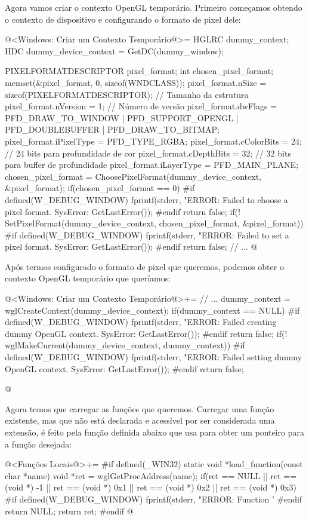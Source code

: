 Agora vamos criar o contexto OpenGL temporário. Primeiro começamos
obtendo o contexto de dispositivo e configurando o formato de pixel
dele:

\iniciocodigo
@<Windows: Criar um Contexto Temporário@>=
HGLRC dummy_context;
HDC dummy_device_context = GetDC(dummy_window);
{
  PIXELFORMATDESCRIPTOR pixel_format;
  int chosen_pixel_format;
  memset(&pixel_format, 0, sizeof(WNDCLASS));
  pixel_format.nSize = sizeof(PIXELFORMATDESCRIPTOR); // Tamanho da estrutura
  pixel_format.nVersion = 1; // Número de versão
  pixel_format.dwFlags = PFD_DRAW_TO_WINDOW | PFD_SUPPORT_OPENGL |
                         PFD_DOUBLEBUFFER | PFD_DRAW_TO_BITMAP;
  pixel_format.iPixelType = PFD_TYPE_RGBA;
  pixel_format.cColorBits = 24; // 24 bits para profundidade de cor
  pixel_format.cDepthBits = 32; // 32 bits para buffer de profundidade
  pixel_format.iLayerType = PFD_MAIN_PLANE;
  chosen_pixel_format = ChoosePixelFormat(dummy_device_context, &pixel_format);
  if(chosen_pixel_format == 0){
#if defined(W_DEBUG_WINDOW)
    fprintf(stderr, "ERROR: Failed to choose a pixel format. SysError: %
            GetLastError());
#endif
    return false;
  }
  if(! SetPixelFormat(dummy_device_context, chosen_pixel_format, &pixel_format)){
#if defined(W_DEBUG_WINDOW)
    fprintf(stderr, "ERROR: Failed to set a pixel format. SysError: %
            GetLastError());
#endif
    return false;
  }
  // ...
@
\fimcodigo

Após termos configurado o formato de pixel que queremos, podemos obter
o contexto OpenGL temporário que queríamos:

\iniciocodigo
@<Windows: Criar um Contexto Temporário@>+=
  // ...
  dummy_context = wglCreateContext(dummy_device_context);
  if(dummy_context == NULL){
#if defined(W_DEBUG_WINDOW)
    fprintf(stderr, "ERROR: Failed creating dummy OpenGL context. SysError: %
            GetLastError());
#endif
    return false;
  }
  if(! wglMakeCurrent(dummy_device_context, dummy_context)){
#if defined(W_DEBUG_WINDOW)
    fprintf(stderr, "ERROR: Failed setting dummy OpenGL context. SysError: %
            GetLastError());
#endif
    return false;
  }
}
@
\fimcodigo

Agora temos que carregar as funções que queremos. Carregar uma função
existente, mas que não está declarada e acessível por ser considerada
uma extensão, é feito pela função definida abaixo que usa
 para obter um ponteiro para a função desejada:

\iniciocodigo
@<Funções Locais@>+=
#if defined(_WIN32)
static void *load_function(const char *name){
  void *ret = wglGetProcAddress(name);
  if(ret == NULL || ret == (void *) -1 || ret == (void *) 0x1 ||
     ret == (void *) 0x2 || ret == (void *) 0x3){
#if defined(W_DEBUG_WINDOW)
    fprintf(stderr, "ERROR: Function '%
#endif
    return NULL;
  }
  return ret;
}
#endif
@
\fimcodigo

